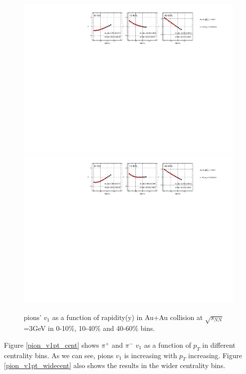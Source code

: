 \begin{figure}[h]
\includegraphics[scale=0.8]{chapter3/fig/v1ypikp/pionp_v1y_wide_cent.pdf}
\includegraphics[scale=0.8]{chapter3/fig/v1ypikp/pionm_v1y_wide_cent.pdf}
\caption{\label{pion_v1y_widecent} pions' $v_{1}$ as a function of rapidity(y) in Au+Au collision at $\sqrt{s_{NN}}$=3GeV in 0-10\%, 10-40\% and 40-60\% bins.}
\end{figure}

\clearpage

Figure \ref{pion_v1pt_cent} shows $\pi^{+}$ and $\pi^{-}$ $v_{1}$ as a function of $p_{T}$ in different centrality bins. As we can see, pions $v_{1}$ is increasing with $p_{T}$ increasing. Figure \ref{pion_v1pt_widecent} also shows the results in the wider centrality bins. 

